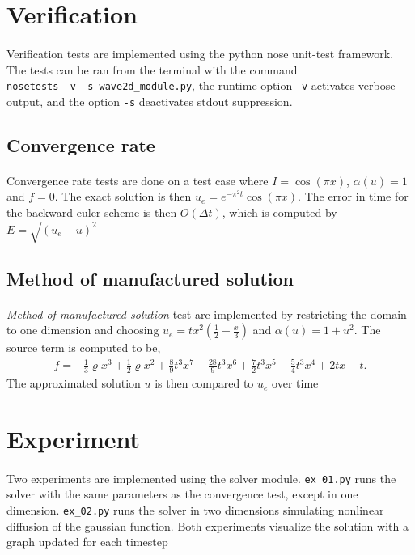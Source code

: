 \documentclass[11pt,a4paper]{article}
\begin{document}
\section{Verification}
\paragraph*{}
Verification tests are implemented using the python nose unit-test framework. The tests can be ran from the terminal with the command\\ \verb|nosetests -v -s wave2d_module.py|, the runtime option \verb|-v| activates verbose output, and the option \verb|-s| deactivates stdout suppression.
\subsection{Convergence rate}
\paragraph*{}
Convergence rate tests are done on a test case where $I = \cos(\pi x)$, $\alpha(u)=1$ and $f = 0$. The exact solution is then $u_e = e^{-\pi^2t} \cos(\pi x)$. The error in time for the backward euler scheme is then $O(\Delta t)$, which is computed by $E = \sqrt{(u_e-u)^2}$
\subsection{Method of manufactured solution}
\paragraph*{}
\textit{Method of manufactured solution} test are implemented by restricting the domain to one dimension and choosing $u_e=tx^2\left(\frac{1}{2}-\frac{x}{3}\right)$ and $\alpha(u)=1+u^2$. The source term is computed to be,
\begin{align*}
f = -\frac{1}{3} \varrho x^{3} + \frac{1}{2} \varrho x^{2} + \frac{8}{9} t^{3} x^{7} - \frac{28}{9} t^{3} x^{6} + \frac{7}{2} t^{3} x^{5} - \frac{5}{4} t^{3} x^{4} + 2 t x - t.
\end{align*}
The approximated solution $u$ is then compared to $u_e$ over time
\section{Experiment}
\paragraph*{}
Two experiments are implemented using the solver module. \verb|ex_01.py| runs the solver with the same parameters as the convergence test, except in one dimension. \verb|ex_02.py| runs the solver in two dimensions simulating nonlinear diffusion of the gaussian function. Both experiments visualize the solution with a graph updated for each timestep
\end{document}
